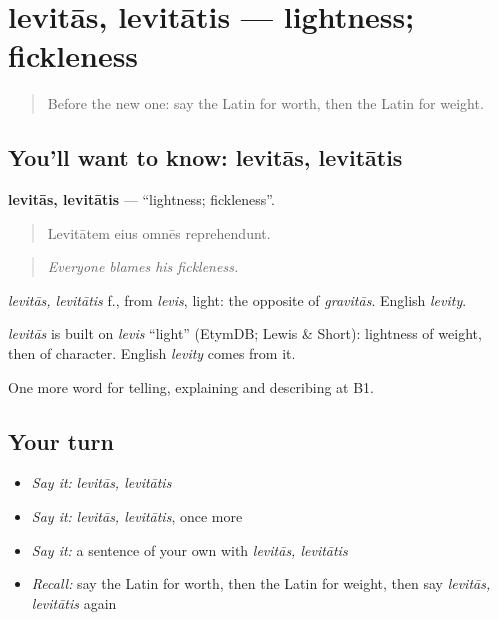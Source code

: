 \section[levitās, levitātis]{levitās, levitātis — lightness; fickleness}

\label{lesson:LA-C370-levitas}



\begin{quote}
Before the new one: say the Latin for worth, then the Latin for weight.
\end{quote}

\subsection*{You'll want to know: levitās, levitātis}
\textbf{levitās, levitātis} — \textquotedblleft{}lightness; fickleness\textquotedblright{}.

\begin{quote}
Levitātem eius omnēs reprehendunt.
\end{quote}

\begin{quote}
\emph{Everyone blames his fickleness.}
\end{quote}

\emph{levitās, levitātis} f., from \emph{levis}, light: the opposite of \emph{gravitās}. English \emph{levity}.

\begin{cousinweb}
\emph{levitās} is built on \emph{levis} \textquotedblleft{}light\textquotedblright{} (EtymDB; Lewis \& Short): lightness of weight, then of character. English \emph{levity} comes from it.
\end{cousinweb}

\begin{grammarlens}[title={What you've built}]
One more word for telling, explaining and describing at B1.
\end{grammarlens}

\subsection*{Your turn}
\begin{itemize}
\raggedright
  \item \emph{Say it:} \emph{levitās, levitātis}
  \item \emph{Say it:} \emph{levitās, levitātis}, once more
  \item \emph{Say it:} a sentence of your own with \emph{levitās, levitātis}
  \item \emph{Recall:} say the Latin for worth, then the Latin for weight, then say \emph{levitās, levitātis} again
\end{itemize}

